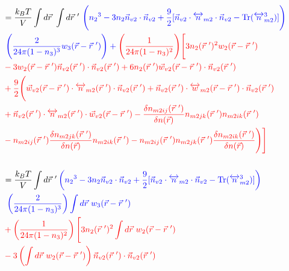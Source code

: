 \documentclass[double,12pt]{revtex4-2}
\begin{document}
\begin{align}   %
&=\frac{k_BT}{V}\int d\vec r~\int d\vec r~'~ \color{blue}\Bigg( {n_2}^3-3n_2
    \vec{n}_{v2}\cdot\vec{n}_{v2} 
     +\frac{9}{2}[\vec{n}_{v2}\cdot{\overleftrightarrow{n}_{m2}}\cdot{
     \vec{n}_{v2}}-\operatorname{Tr}({\overleftrightarrow{n}^3_{m2}})]
     \Bigg) \nonumber\\
     &~\color{blue}\Bigg(\frac{2}{24\pi(1-n_3)^3} w_3(\vec r-\vec r~')
     \Bigg) 
     + \color{red}\Bigg(\frac{1}{24\pi(1-n_3)^2}\Bigg)
     \Bigg[
     3n_2(\vec r~')^2
     w_2(\vec r-\vec r~') \nonumber\\
     &\color{red}- 3w_2(\vec r-\vec r~')\vec n_{v2}
     (\vec r~') \cdot \vec n_{v2}(\vec r~') + 6n_2(\vec r~')
     \vec w_{v2}(\vec r-\vec r~')\cdot \vec n_{v2}(\vec r~') \nonumber \\
     &\color{red}+\frac{9}{2}\Bigg(\vec w_{v2}
     (\vec r-\vec r~')
     \cdot \overleftrightarrow n_{m2}(\vec r~')\cdot \vec n_{v2}( \vec r~')
     +\vec n_{v2}(\vec r~')\cdot \overleftrightarrow w_{m2}(\vec r-\vec r~')
     \cdot \vec n_{v2}( \vec r~') \nonumber\\
     &\color{red}+ \vec n_{v2}(\vec r~')\cdot \overleftrightarrow n_{m2}(\vec r~') 
     \cdot \vec w_{v2}(\vec r-\vec r~')
     -\frac{\delta n_{m2ij}(\vec r~')}{\delta n(\vec r)}n_{m2jk}(\vec r~')
     n_{m2ik}(\vec r~') \nonumber \\     
     &\color{red}-n_{m2ij}(\vec r~')\frac{\delta n_{m2jk}(\vec r~')}
     {\delta n(\vec r)}n_{m2ik}(\vec r~') - n_{m2ij}(\vec r~')n_{m2jk}
     (\vec r~')\frac{\delta n_{m2ik}(\vec r~')}
     {\delta n(\vec r)}\Bigg)
     \Bigg]   \\ \nonumber \\
%
&=\frac{k_BT}{V}\int d\vec r~' \color{blue}\left( {n_2}^3-3n_2
    \vec{n}_{v2}\cdot\vec{n}_{v2} 
     +\frac{9}{2}[\vec{n}_{v2}\cdot{\overleftrightarrow{n}_{m2}}\cdot{
     \vec{n}_{v2}}-\operatorname{Tr}({\overleftrightarrow{n}^3_{m2}})]
     \right) \nonumber\\
     &\color{blue}~\left(\frac{2}{24\pi(1-n_3)^3}\right) \int d\vec r~ w_3(\vec r
     -\vec r~') \nonumber\\
     &\color{red}+\left(\frac{1}{24\pi(1-n_3)^2}\right)
     \Bigg[ 
     3n_2(\vec r~')^2
     \int d\vec r~ w_2(\vec r-\vec r~') 
     \nonumber \\
     &\color{red}-3\left(\int d\vec r ~w_2(\vec r-\vec r~')\right)\vec n_{v2}(\vec r~')
     \cdot \vec n_{v2}(\vec r~') \nonumber\\

\end{align}
\end{document}
